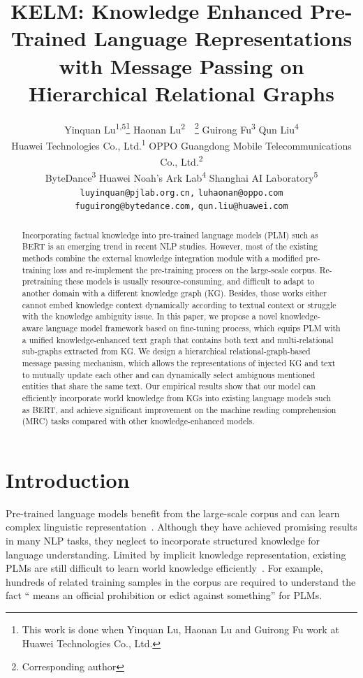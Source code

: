 \documentclass{article} \usepackage{iclr2022_conference,times}
\title{KELM: Knowledge Enhanced Pre-Trained Language Representations with Message Passing on Hierarchical Relational Graphs}
\author{Yinquan Lu\textsuperscript{\rm 1,}\textsuperscript{\rm 5}\thanks{This work is done when Yinquan Lu, Haonan Lu and
Guirong Fu work at Huawei Technologies Co., Ltd.}\quad
Haonan Lu\textsuperscript{\rm 2}\footnotemark[1]\ \ \thanks{Corresponding author}\quad
Guirong Fu\textsuperscript{\rm 3}\footnotemark[1]\quad
Qun Liu\textsuperscript{\rm 4}\\
Huawei Technologies Co., Ltd.\textsuperscript{\rm 1} \quad
OPPO Guangdong Mobile Telecommunications Co., Ltd.\textsuperscript{\rm 2} \\
ByteDance\textsuperscript{\rm 3} \quad
Huawei Noah’s Ark Lab\textsuperscript{\rm 4} \quad
Shanghai AI Laboratory\textsuperscript{\rm 5} \\
\texttt{luyinquan@pjlab.org.cn,}\quad
\texttt{luhaonan@oppo.com}\\
\texttt{fuguirong@bytedance.com,}\quad
\texttt{qun.liu@huawei.com}
}
\begin{document}
\maketitle

\begin{abstract}
Incorporating factual knowledge into pre-trained language models (PLM) such as BERT is an emerging trend in recent NLP studies. However, most of the existing methods combine the external knowledge integration module with a modified pre-training loss and re-implement the pre-training process on the large-scale corpus. Re-pretraining these models is usually resource-consuming, and difficult to adapt to another domain with a different knowledge graph (KG). Besides, those works either cannot embed knowledge context dynamically according to textual context or struggle with the knowledge ambiguity issue. In this paper, we propose a novel knowledge-aware language model framework based on fine-tuning process, which equips PLM with a unified knowledge-enhanced text graph that contains both text and multi-relational sub-graphs extracted from KG. We design a hierarchical relational-graph-based message passing mechanism, which allows the representations of injected KG and text to mutually update each other and can dynamically select ambiguous mentioned entities that share the same text. Our empirical results show that our model can efficiently incorporate world knowledge from KGs into existing language models such as BERT, and achieve significant improvement on the machine reading comprehension (MRC) tasks compared with other knowledge-enhanced models.
\end{abstract}

\section{Introduction}
Pre-trained language models benefit from the large-scale corpus and can learn complex linguistic representation~\citep{devlin-etal-2019-bert, liu2019roberta, yang2020xlnet}. Although they have achieved promising results in many NLP tasks, they neglect to incorporate structured knowledge for language understanding.
Limited by implicit knowledge representation, existing PLMs are still difficult to learn world knowledge efficiently~\citep{Poerner2019BERTIN, yu2020jaket}. For example, hundreds of related training samples in the corpus are required to understand the fact `` means an official prohibition or edict against something'' for PLMs. 
\end{document}
